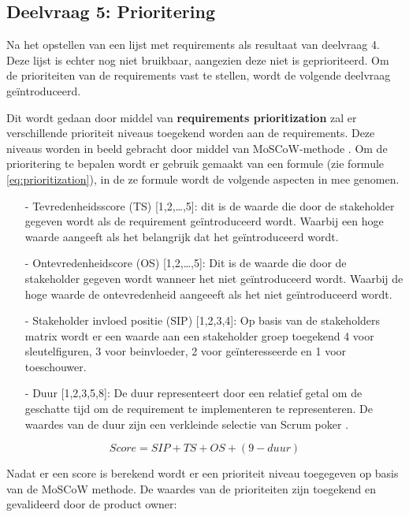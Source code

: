 \subsection{Deelvraag 5: Prioritering}
Na het opstellen van een lijst met requirements als resultaat van deelvraag 4.
Deze lijst is echter nog niet bruikbaar, aangezien deze niet is geprioriteerd.
Om de prioriteiten van de requirements vast te stellen, wordt de volgende deelvraag geïntroduceerd.

\begin{center}
	\textit{\SubquestionFive}
\end{center}

\whitespace[0.2]
Dit wordt gedaan door middel van \textbf{requirements prioritization} zal er verschillende prioriteit niveaus toegekend worden aan de requirements.
Deze niveaus worden in beeld gebracht door middel van MoSCoW-methode \Parencite{MoSCoW}.
Om de prioritering te bepalen wordt er gebruik gemaakt van een formule (zie formule \ref{eq:prioritization}), in de ze formule wordt de volgende aspecten in mee genomen.
\begin{enumerate}
	\item[-] Tevredenheidsscore (TS) [1,2,\ldots,5]: dit is de waarde die door de stakeholder gegeven wordt als de requirement geïntroduceerd wordt. Waarbij een hoge waarde aangeeft als het belangrijk dat het geïntroduceerd wordt.
	\item[-] Ontevredenheidscore (OS) [1,2,\dots,5]: Dit is de waarde die door de stakeholder gegeven wordt wanneer het niet geïntroduceerd wordt. Waarbij de hoge waarde de ontevredenheid aangeeeft als het niet geïntroduceerd wordt.
	\item[-] Stakeholder invloed positie (SIP) [1,2,3,4]: Op basis van de stakeholders matrix wordt er een waarde aan een stakeholder groep toegekend 4 voor sleutelfiguren, 3 voor beinvloeder, 2 voor geïnteresseerde en 1 voor toeschouwer.
	\item[-] Duur [1,2,3,5,8]: De duur representeert door een relatief getal om de geschatte tijd om de requirement te implementeren te representeren.
	      De waardes van de duur zijn een verkleinde selectie van Scrum poker \Parencite{ScrumPoker}.
\end{enumerate}

\whitespace
\begin{equation}
	\label{eq:prioritization}
	Score = SIP + TS + OS + (9 - duur)
\end{equation}

\whitespace
Nadat er een score is berekend wordt er een prioriteit niveau toegegeven op basis van de MoSCoW methode.
De waardes van de prioriteiten zijn toegekend en gevalideerd door de product owner:

